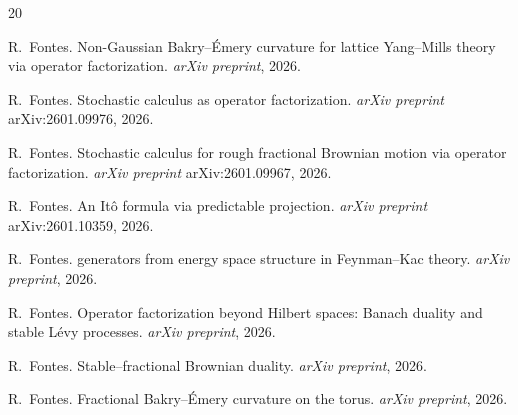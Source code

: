 \documentclass[11pt,a4paper]{article}
\theoremstyle{plain}
\theoremstyle{definition}
\theoremstyle{remark}
\begin{document}
\begin{thebibliography}{20}

R.~Fontes.
\newblock Non-{G}aussian {B}akry--\'Emery curvature for lattice
  {Y}ang--{M}ills theory via operator factorization.
\newblock \emph{arXiv preprint}, 2026.

R.~Fontes.
\newblock Stochastic calculus as operator factorization.
\newblock \emph{arXiv preprint} arXiv:2601.09976, 2026.

R.~Fontes.
\newblock Stochastic calculus for rough fractional {B}rownian motion
  via operator factorization.
\newblock \emph{arXiv preprint} arXiv:2601.09967, 2026.

R.~Fontes.
\newblock An {I}t\^o formula via predictable projection.
\newblock \emph{arXiv preprint} arXiv:2601.10359, 2026.

R.~Fontes.
 generators from energy space structure in
  {F}eynman--{K}ac theory.
\newblock \emph{arXiv preprint}, 2026.

R.~Fontes.
\newblock Operator factorization beyond {H}ilbert spaces: {B}anach
  duality and stable {L}\'evy processes.
\newblock \emph{arXiv preprint}, 2026.

R.~Fontes.
\newblock Stable--fractional {B}rownian duality.
\newblock \emph{arXiv preprint}, 2026.

R.~Fontes.
\newblock Fractional {B}akry--\'Emery curvature on the torus.
\newblock \emph{arXiv preprint}, 2026.

\end{thebibliography}
\end{document}
